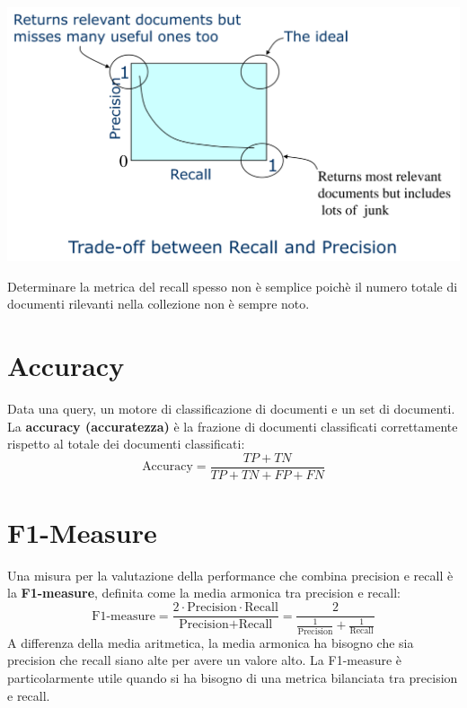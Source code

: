 \documentclass{report}
\begin{document}
	\begin{center}
		\includegraphics[scale=0.5]{assets/precision-vs-recall.png}
	\end{center}
	Determinare la metrica del recall spesso non è semplice poichè il numero totale di documenti rilevanti nella collezione non è sempre noto.
	\section{Accuracy}
	Data una query, un motore di classificazione di documenti e un set di documenti. La \textbf{accuracy (accuratezza)} è la frazione di documenti classificati correttamente rispetto al totale dei documenti classificati:
	\[
		\text{Accuracy} = \frac{TP + TN}{TP + TN + FP + FN}
	\]
	
	\section{F1-Measure}
	Una misura per la valutazione della performance che combina precision e recall è la \textbf{F1-measure}, definita come la media armonica tra precision e recall:
	\[
		\text{F1-measure} = \frac{2 \cdot \text{Precision} \cdot \text{Recall}}{\text{Precision} + \text{Recall}} = \frac{2}{\frac{1}{\text{Precision}} + \frac{1}{\text{Recall}}}
	\]
	A differenza della media aritmetica, la media armonica ha bisogno che sia precision che recall siano alte per avere un valore alto. La F1-measure è particolarmente utile quando si ha bisogno di una metrica bilanciata tra precision e recall.
\end{document}
